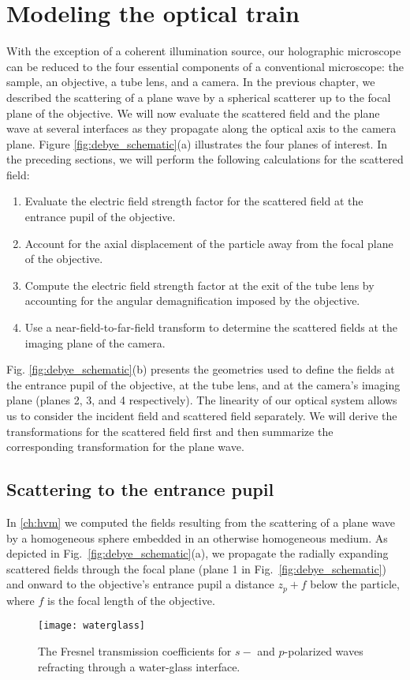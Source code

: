 \section{Modeling the optical train}

With the exception of a coherent illumination source, our holographic microscope
can be reduced to the four essential components of a conventional microscope:
the sample, an objective, a tube lens, and a camera. In the previous chapter,
we described the scattering of a plane wave by a spherical scatterer up to
the focal plane of the objective. We will now evaluate the scattered field and
the plane wave at several interfaces as they propagate along the optical axis
to the camera plane. Figure \ref{fig:debye_schematic}(a) illustrates the four planes
of interest. In the preceding sections, we will perform the following calculations
for the scattered field:
\begin{enumerate}
\item Evaluate the electric field strength factor for the scattered field at
  the entrance pupil of the objective.
\item Account for the axial displacement of the particle away from the focal
  plane of the objective.
\item Compute the electric field strength factor at the exit of the tube lens
  by accounting for the angular demagnification imposed by the objective.
\item Use a near-field-to-far-field transform to determine the scattered
  fields at the imaging plane of the camera.
\end{enumerate}
Fig. \ref{fig:debye_schematic}(b) presents the geometries used to define the
fields at the entrance pupil of the objective, at the tube lens, and at the camera's
imaging plane (planes \num{2}, \num{3}, and \num{4} respectively).
The linearity of our optical system allows us to consider the incident field
and scattered field separately. We will derive the transformations for the
scattered field first and then summarize the corresponding transformation for the
plane wave.

\subsection{Scattering to the entrance pupil}

In \autoref{ch:hvm} we computed the fields resulting from the scattering of
a plane wave by a homogeneous sphere embedded in an otherwise
homogeneous medium. As depicted in Fig.~\ref{fig:debye_schematic}(a), we
propagate the radially expanding scattered fields through the focal plane (plane \num{1} in
Fig.~\ref{fig:debye_schematic}) and onward to the objective's entrance pupil a distance
$z_p + f$ below the particle, where $f$ is the focal length of the objective.
\begin{figure}
  \centering
  \texttt{[image: waterglass]}
  \caption{The Fresnel transmission coefficients for $s-$ and $p$-polarized
  waves refracting through a water-glass interface.}
  \label{fig:waterglass}
\end{figure}

